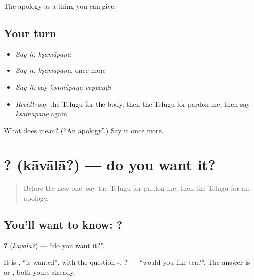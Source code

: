 \begin{grammarlens}[title={What you've built}]
The apology as a thing you can give.
\end{grammarlens}

\subsection*{Your turn}
\begin{itemize}
\raggedright
  \item \emph{Say it:} \emph{kṣamāpaṇa}
  \item \emph{Say it:} \emph{kṣamāpaṇa}, once more
  \item \emph{Say it:} say \emph{kṣamāpaṇa ceppaṇḍi}
  \item \emph{Recall:} say the Telugu for the body, then the Telugu for pardon me, then say \emph{kṣamāpaṇa} again
\end{itemize}

\begin{tcolorbox}[breakable,colback=teal!4,colframe=teal!35!black,title={Before you move on}]
What does  mean? (\textquotedblleft{}An apology\textquotedblright{}.) Say it once more.
\end{tcolorbox}
\section[\texorpdfstring{\te{కావాలా}? (kāvālā?)}{కావాలా? (kāvālā?)}]{? (kāvālā?) — do you want it?}

\label{lesson:TE-C94-offer}



\begin{quote}
Before the new one: say the Telugu for pardon me, then the Telugu for an apology.
\end{quote}

\subsection*{You'll want to know: ?}
\textbf{?} (\emph{kāvālā?}) — \textquotedblleft{}do you want it?\textquotedblright{}.

It is \textbf{}, \textquotedblleft{}is wanted\textquotedblright{}, with the question \textbf{-}. \textbf{ ?} — \textquotedblleft{}would you like tea?\textquotedblright{}. The answer is \textbf{} or \textbf{}, both yours already.

